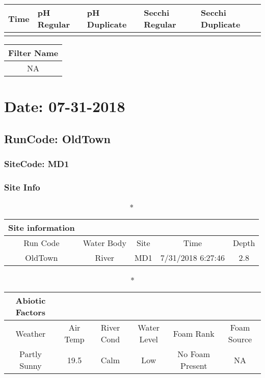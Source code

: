\documentclass[
  letterpaper,
  DIV=11,
  numbers=noendperiod]{scrartcl}
\begin{document}
\begin{longtable*}{lllll}
\toprule
Time & pH Regular & pH Duplicate & Secchi Regular & Secchi Duplicate \\ 
\midrule\addlinespace[2.5pt]
\bottomrule
\end{longtable*}

\begin{longtable*}{c}
\toprule
Filter Name \\ 
\midrule\addlinespace[2.5pt]
NA \\ 
\bottomrule
\end{longtable*}

\hypertarget{date-07-31-2018-1}{%
\section{Date: 07-31-2018}\label{date-07-31-2018-1}}

\hypertarget{runcode-oldtown-1}{%
\subsection{RunCode: OldTown}\label{runcode-oldtown-1}}

\hypertarget{sitecode-md1}{%
\subsubsection{SiteCode: MD1}\label{sitecode-md1}}

\subsubsection{Site Info}

\begin{longtable*}{ccccc}
\caption*{
{\large Site information}
} \\ 
\toprule
Run Code & Water Body & Site & Time & Depth \\ 
\midrule\addlinespace[2.5pt]
OldTown & River & MD1 & 7/31/2018 6:27:46 & 2.8 \\ 
\bottomrule
\end{longtable*}

\begin{longtable*}{cccccc}
\caption*{
{\large Abiotic Factors}
} \\ 
\toprule
Weather & Air Temp & River Cond & Water Level & Foam Rank & Foam Source \\ 
\midrule\addlinespace[2.5pt]
Partly Sunny & 19.5 & Calm & Low & No Foam Present & NA \\ 
\bottomrule
\end{longtable*}
\end{document}
